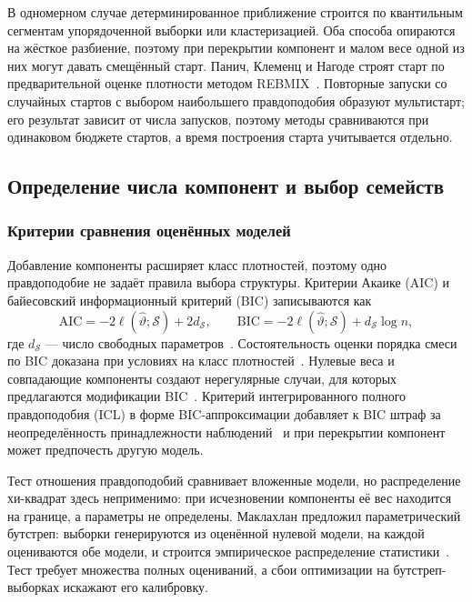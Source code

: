 В одномерном случае детерминированное приближение строится по квантильным сегментам упорядоченной выборки или кластеризацией. Оба способа опираются на жёсткое разбиение, поэтому при перекрытии компонент и малом весе одной из них могут давать смещённый старт. Панич, Клеменц и Нагоде строят старт по предварительной оценке плотности методом REBMIX~\cite{Panic2020}. Повторные запуски со случайных стартов с выбором наибольшего правдоподобия образуют мультистарт; его результат зависит от числа запусков, поэтому методы сравниваются при одинаковом бюджете стартов, а время построения старта учитывается отдельно.

\subsection{Определение числа компонент и выбор семейств}
\label{sec:structure-selection}

\subsubsection{Критерии сравнения оценённых моделей}

Добавление компоненты расширяет класс плотностей, поэтому одно правдоподобие не задаёт правила выбора структуры. Критерии Акаике (AIC) и байесовский информационный критерий (BIC) записываются как
\begin{equation}
    \mathrm{AIC}=-2\ell(\widehat\vartheta;\mathcal{S})+2d_{\mathcal{S}},
    \qquad
    \mathrm{BIC}=-2\ell(\widehat\vartheta;\mathcal{S})+d_{\mathcal{S}}\log n,
    \label{eq:information-criteria}
\end{equation}
где $d_{\mathcal{S}}$ --- число свободных параметров~\cite{Akaike1974,Schwarz1978}. Состоятельность оценки порядка смеси по BIC доказана при условиях на класс плотностей~\cite{Keribin2000}. Нулевые веса и совпадающие компоненты создают нерегулярные случаи, для которых предлагаются модификации BIC~\cite{NguyenNguyen2026}. Критерий интегрированного полного правдоподобия (ICL) в форме BIC-аппроксимации добавляет к BIC штраф за неопределённость принадлежности наблюдений~\cite{Biernacki2000} и при перекрытии компонент может предпочесть другую модель.

Тест отношения правдоподобий сравнивает вложенные модели, но распределение хи-квадрат здесь неприменимо: при исчезновении компоненты её вес находится на границе, а параметры не определены. Маклахлан предложил параметрический бутстреп: выборки генерируются из оценённой нулевой модели, на каждой оцениваются обе модели, и строится эмпирическое распределение статистики~\cite{McLachlan1987}. Тест требует множества полных оцениваний, а сбои оптимизации на бутстреп-выборках искажают его калибровку.

